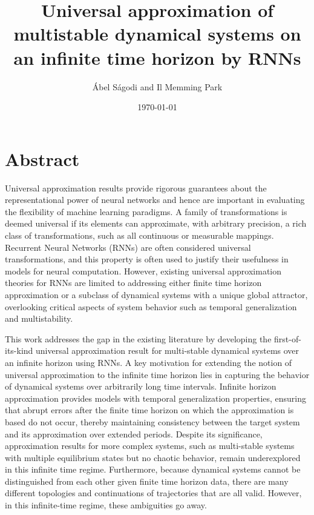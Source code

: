 \documentclass{article}
\title{Universal approximation of multistable dynamical systems on an infinite time horizon by RNNs}
\author{\'Abel S\'agodi and Il Memming Park}
\date{\today}
\theoremstyle{definition} \newtheorem{definition}{Definition}
\theoremstyle{remark} \newtheorem{remark}{Remark}
\newcounter{ct}
\begin{document}
\maketitle

\section*{Abstract}
Universal approximation results provide rigorous guarantees about the representational power of neural networks and hence are important in evaluating the flexibility of machine learning paradigms. A family of transformations is deemed universal if its elements can approximate, with arbitrary precision, a rich class of transformations, such as all continuous or measurable mappings. Recurrent Neural Networks (RNNs) are often considered universal transformations, and this property is often used to justify their usefulness in models for neural computation. However, existing universal approximation theories for RNNs are limited to addressing either finite time horizon approximation or a subclass of dynamical systems with a unique global attractor, overlooking critical aspects of system behavior such as temporal generalization and multistability.


This work addresses the gap in the existing literature by developing the first-of-its-kind universal approximation result for multi-stable dynamical systems over an infinite horizon using RNNs. A key motivation for extending the notion of universal approximation to the infinite time horizon lies in capturing the behavior of dynamical systems over arbitrarily long time intervals. Infinite horizon approximation provides models with temporal generalization properties, ensuring that abrupt errors after the finite time horizon on which the approximation is based do not occur, thereby maintaining consistency between the target system and its approximation over extended periods. Despite its significance, approximation results for more complex systems, such as multi-stable systems with multiple equilibrium states but no chaotic behavior, remain underexplored in this infinite time regime. Furthermore, because dynamical systems cannot be distinguished from each other given finite time horizon data, there are many different topologies and continuations of trajectories that are all valid. However, in this infinite-time regime, these ambiguities go away.
\end{document}
